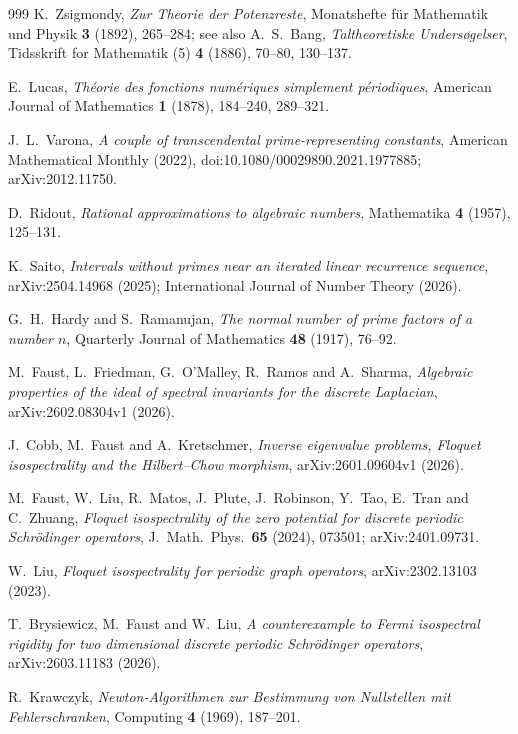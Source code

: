 \documentclass[11pt]{amsart}
\theoremstyle{definition}
\theoremstyle{remark}
\begin{document}
\begin{thebibliography}{999}
K.~Zsigmondy,
\emph{Zur Theorie der Potenzreste},
Monatshefte f\"ur Mathematik und Physik \textbf{3} (1892), 265--284;
see also A.~S.~Bang, \emph{Taltheoretiske Unders\o gelser}, Tidsskrift for Mathematik (5) \textbf{4} (1886), 70--80, 130--137.

E.~Lucas,
\emph{Th\'eorie des fonctions num\'eriques simplement p\'eriodiques},
American Journal of Mathematics \textbf{1} (1878), 184--240, 289--321.

J.~L.~Varona,
\emph{A couple of transcendental prime-representing constants},
American Mathematical Monthly (2022), doi:10.1080/00029890.2021.1977885; arXiv:2012.11750.

D.~Ridout,
\emph{Rational approximations to algebraic numbers},
Mathematika \textbf{4} (1957), 125--131.

K.~Saito,
\emph{Intervals without primes near an iterated linear recurrence sequence},
arXiv:2504.14968 (2025); International Journal of Number Theory (2026).

G.~H.~Hardy and S.~Ramanujan,
\emph{The normal number of prime factors of a number $n$},
Quarterly Journal of Mathematics \textbf{48} (1917), 76--92.

M.~Faust, L.~Friedman, G.~O'Malley, R.~Ramos and A.~Sharma,
\emph{Algebraic properties of the ideal of spectral invariants for the discrete Laplacian},
arXiv:2602.08304v1 (2026).

J.~Cobb, M.~Faust and A.~Kretschmer,
\emph{Inverse eigenvalue problems, Floquet isospectrality and the Hilbert--Chow morphism},
arXiv:2601.09604v1 (2026).

M.~Faust, W.~Liu, R.~Matos, J.~Plute, J.~Robinson, Y.~Tao, E.~Tran and C.~Zhuang,
\emph{Floquet isospectrality of the zero potential for discrete periodic Schr\"odinger operators},
J.~Math.~Phys.~\textbf{65} (2024), 073501; arXiv:2401.09731.

W.~Liu,
\emph{Floquet isospectrality for periodic graph operators},
arXiv:2302.13103 (2023).

T.~Brysiewicz, M.~Faust and W.~Liu,
\emph{A counterexample to Fermi isospectral rigidity for two dimensional discrete periodic Schr\"odinger operators},
arXiv:2603.11183 (2026).

R.~Krawczyk,
\emph{Newton-Algorithmen zur Bestimmung von Nullstellen mit Fehlerschranken},
Computing \textbf{4} (1969), 187--201.


\end{thebibliography}
\end{document}

